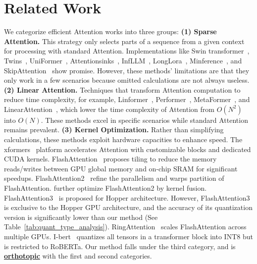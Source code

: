 \section{Related Work}

We categorize efficient Attention works into three groups: 
\textbf{(1) Sparse Attention.} This strategy only selects parts of a sequence from a given context for processing with standard Attention. Implementations like Swin transformer~\citep{liu2021swin}, Twins~\citep{chu2021twins}, UniFormer~\citep{liuniformer}, Attentionsinks~\citep{xiao2023efficient}, InfLLM~\citep{xiao2024infllm}, LongLora~\citep{chen2023longlora}, Minference~\citep{jiang2024minference}, and SkipAttention~\citep{venkataramanan2023skip} show promise. However, these methods' limitations are that they only work in a few scenarios because omitted calculations are not always useless.
\textbf{(2) Linear Attention.} Techniques that transform Attention computation to reduce time complexity, for example, Linformer~\citep{wang2020linformer}, Performer~\citep{choromanski2020rethinking}, MetaFormer~\citep{yu2022metaformer}, and LinearAttention~\citep{katharopoulos2020transformers}, which lower the time complexity of Attention from $O(N^2)$ into $O(N)$. These methods excel in specific scenarios while standard Attention remains prevalent.
\textbf{(3) Kernel Optimization.} Rather than simplifying calculations, these methods exploit hardware capacities to enhance speed. The xformers~\citep{xFormers2022} platform accelerates Attention with customizable blocks and dedicated CUDA kernels. FlashAttention~\citep{dao2022flashattention} proposes tiling to reduce the memory reads/writes between GPU global memory and on-chip SRAM for significant speedups. FlashAttention2~\citep{dao2023flashattention} refine the parallelism and warps partition of FlashAttention. \citet{bikshandi2023case} further optimize FlashAttention2 by kernel fusion. FlashAttention3~\citep{shah2024flashattention} is proposed for Hopper architecture. However, FlashAttention3 is exclusive to the Hopper GPU architecture, and the accuracy of its quantization version is significantly lower than our method (See Table~\ref{tab:quant_type_analysis}). RingAttention~\citep{liuringattention} scales FlashAttention across multiple GPUs. I-bert~\citep{kim2021bert} quantizes all tensors in a transformer block into INT8 but is restricted to RoBERTa.
Our method falls under the third category, and is \underline{\textbf{orthotopic}} with the first and second categories. 
